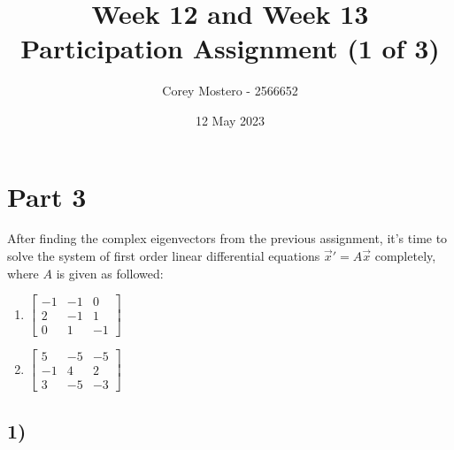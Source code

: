 \documentclass{article}
\title{Week 12 and Week 13 Participation Assignment (1 of 3)}
\date{12 May 2023}
\author{Corey Mostero - 2566652}
\begin{document}
\newcommand{\hr}{\par\noindent\rule{\textwidth}{0.4pt}}

\newcommand{\bc}[1]{
	\begin{equation*}
		\begin{boxed}
			{#1}
		\end{boxed}
	\end{equation*}
}

\newcommand{\cond}[2]{
	\ifmmode
		{#1} \quad {#2}
	\else
		$$ {#1} \quad {#2} $$
	\fi
}

\newcommand{\matr}[1]{\bm{#1}}
\newcommand{\vect}[1]{\mathbf{#1}}

\section{Part 3}

After finding the complex eigenvectors from the previous assignment, it's time to solve the system of first order linear differential equations $ \vec{x}' = A\vec{x} $ completely, where $ A $ is given as followed:
\begin{enumerate}[label = \textbf{\arabic*)}]
	\item
		$ \begin{bmatrix}
			-1 & -1 & 0 \\
			2 & -1 & 1 \\
			0 & 1 & -1
		\end{bmatrix} $
	\item
		$ \begin{bmatrix}
			5 & -5 & -5 \\
			-1 & 4 & 2 \\
			3 & -5 & -3
		\end{bmatrix} $
\end{enumerate}

\subsection{1)}
\end{document}
